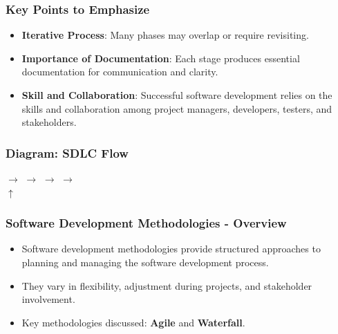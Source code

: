 \documentclass{beamer}
\begin{document}
\begin{frame}[fragile]
    \frametitle{Key Points to Emphasize}
    \begin{itemize}
        \item \textbf{Iterative Process}: Many phases may overlap or require revisiting.
        \item \textbf{Importance of Documentation}: Each stage produces essential documentation for communication and clarity.
        \item \textbf{Skill and Collaboration}: Successful software development relies on the skills and collaboration among project managers, developers, testers, and stakeholders.
    \end{itemize}
\end{frame}

\begin{frame}[fragile]
    \frametitle{Diagram: SDLC Flow}
    \begin{center}
    \text{[Planning]} $\rightarrow$ \text{[Design]} $\rightarrow$ \text{[Development]} $\rightarrow$ \text{[Testing]} $\rightarrow$ \text{[Maintenance]} \\
     $\uparrow$ \quad {} 
    \end{center}
\end{frame}

\begin{frame}[fragile]
    \frametitle{Software Development Methodologies - Overview}
    \begin{itemize}
        \item Software development methodologies provide structured approaches to planning and managing the software development process.
        \item They vary in flexibility, adjustment during projects, and stakeholder involvement.
        \item Key methodologies discussed: \textbf{Agile} and \textbf{Waterfall}.
    \end{itemize}
\end{frame}
\end{document}
